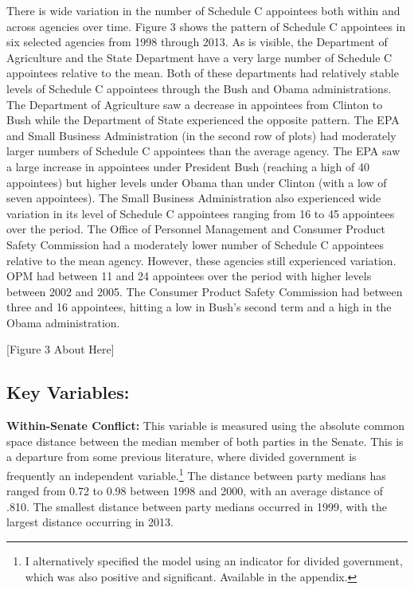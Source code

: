 \documentclass[12pt]{article}
\begin{document}
There is wide variation in the number of Schedule C appointees both within and across agencies over time. Figure 3 shows the pattern of Schedule C appointees in six selected agencies from 1998 through 2013. As is visible, the Department of Agriculture and the State Department have a very large number of Schedule C appointees relative to the mean. Both of these departments had relatively stable levels of Schedule C appointees through the Bush and Obama administrations. The Department of Agriculture saw a decrease in appointees from Clinton to Bush while the Department of State experienced the opposite pattern. The EPA and Small Business Administration (in the second row of plots) had moderately larger numbers of Schedule C appointees than the average agency. The EPA saw a large increase in appointees under President Bush (reaching a high of 40 appointees) but higher levels under Obama than under Clinton (with a low of seven appointees). The Small Business Administration also experienced wide variation in its level of Schedule C appointees ranging from 16 to 45 appointees over the period. The Office of Personnel Management and Consumer Product Safety Commission had a moderately lower number of Schedule C appointees relative to the mean agency. However, these agencies still experienced variation. OPM had between 11 and 24 appointees over the period with higher levels between 2002 and 2005. The Consumer Product Safety Commission had between three and 16 appointees, hitting a low in Bush's second term and a high in the Obama administration.  

\begin{center}[Figure 3 About Here]\end{center}

\subsection*{Key Variables:}

\noindent \textbf{Within-Senate Conflict:} This variable is measured using the absolute common space distance between the median member of both parties in the Senate. This is a departure from some previous literature, where divided government is frequently an independent variable.\footnote{I alternatively specified the model using an indicator for divided government, which was also positive and significant. Available in the appendix.} The distance between party medians has ranged from 0.72 to 0.98 between 1998 and 2000, with an average distance of .810. The smallest distance between party medians occurred in 1999, with the largest distance occurring in 2013. 
\end{document}
